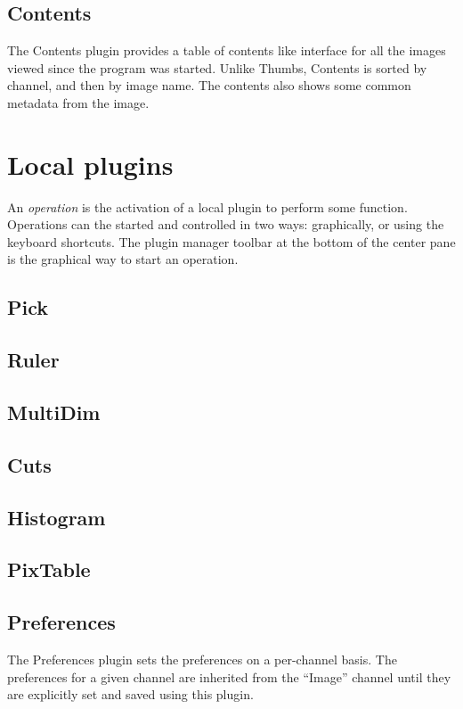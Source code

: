 \documentclass[11pt]{report}
\begin{document}
\newpage
\subsection{Contents}
The Contents plugin provides a table of contents like interface for all
the images viewed since the program was started.  Unlike Thumbs,
Contents is sorted by channel, and then by image name.  The contents
also shows some common metadata from the image.

\section{Local plugins}

An {\em operation} is the activation of a local plugin to perform some
function.  Operations can the started and controlled in two ways:
graphically, or using the keyboard shortcuts.  The plugin manager
toolbar at the bottom of the center pane is the graphical way to start
an operation.  


\subsection{Pick}
\subsection{Ruler}
\subsection{MultiDim}
\subsection{Cuts}
\subsection{Histogram}
\subsection{PixTable}
\subsection{Preferences}
The Preferences plugin sets the preferences on a per-channel basis.
The preferences for a given channel are inherited from the ``Image''
channel until they are explicitly set and saved using this plugin.

\newpage
\end{document}
